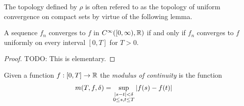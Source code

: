The topology defined by $\rho$ is often refered to as the topology of
uniform convergence on compact sets by virtue of the following lemma.
\begin{lem}\label{UniformConvergenceOnCompacts}A sequence $f_n$
  converges to $f$ in $C^\infty([0,\infty), \mathbb{R})$ if and only if
  $f_n$ converges to $f$ uniformly on every interval $[0,T]$ for $T > 0$.
\end{lem}
\begin{proof}
TODO:  This is elementary.
\end{proof}

\begin{defn}Given a function $f : [0,T] \to \mathbb{R}$ the \emph{modulus
    of continuity} is the function
\begin{align*}
m(T, f, \delta) &= \sup_{\substack{\left \vert s - t \right \vert < \delta \\
0 \leq s,t \leq T}} \left \vert f(s) - f(t) \right \vert
\end{align*}
\end{defn}

